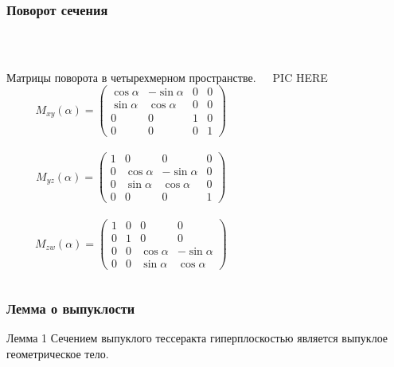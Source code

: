 \documentclass[10pt,pdf,hyperref={unicode}]{beamer}
\begin{document}
\begin{frame}
	\frametitle{Поворот сечения}
	\\

	\begin{columns}
	\begin{block}{Матрицы поворота в четырехмерном пространстве.}
		{\footnotesize
			$$
			M_{xy}(\alpha)=
			\left(
			\begin{array}{cccc}
				\cos \alpha & -\sin \alpha & 0 & 0 \\
				\sin \alpha & \cos \alpha & 0 & 0 \\
				0 & 0 & 1 & 0 \\
				0 & 0 & 0 & 1
			\end{array}\right)
			$$
			\\
			
			\newline
			$$
			M_{yz}(\alpha)=
			\left(
			\begin{array}{cccc}
				1 & 0 & 0 & 0 \\
				0 & \cos \alpha & -\sin \alpha & 0 \\
				0 & \sin \alpha & \cos \alpha & 0 \\
				0 & 0 & 0 & 1
			\end{array}\right)
			$$	
			\\ 

			$$
			M_{zw}(\alpha)=
			\left(
			\begin{array}{cccc}
				1 & 0 & 0 & 0 \\
				0 & 1 & 0 & 0 \\
				0 & 0 & \cos \alpha & -\sin \alpha \\
				0 & 0 & \sin \alpha & \cos \alpha
			\end{array}\right)
			$$
		}

\end{block}
PIC HERE
\end{columns}
\end{frame}
\begin{frame}
	\frametitle{Лемма о выпуклости}
	\begin{block}{Лемма 1}
		Сечением выпуклого тессеракта гиперплоскостью является выпуклое геометрическое тело.
	\end{block}
\end{frame}
\end{document}
